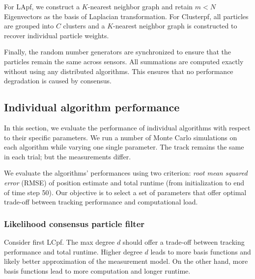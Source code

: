 \documentclass[10pt,letterpaper,final]{article}
\begin{document}
For LApf, we construct a $K$-nearest neighbor graph and retain $m< N$ Eigenvectors as the basis of Laplacian transformation. For Clusterpf, all particles are grouped into $C$ clusters and a $K$-nearest neighbor graph is constructed to recover individual particle weights. 

Finally, the random number generators are synchronized to ensure that the particles remain the same across sensors. All summations are computed exactly without using any distributed algorithms. This ensures that no performance degradation is caused by consensus.

\subsection{Individual algorithm performance}
In this section, we evaluate the performance of individual algorithms with respect to their specific parameters. We run a number of Monte Carlo simulations on each algorithm while varying one single parameter. The track remains the same in each trial; but the measurements differ. 

We evaluate the algorithms' performances using two criterion: \textit{root mean squared error} (RMSE) of position estimate and total runtime (from initialization to end of time step 50). Our objective is to select a set of parameters that offer optimal trade-off between tracking performance and computational load. 

\subsubsection{Likelihood consensus particle filter}
Consider first LCpf. The max degree $d$ should offer a trade-off between tracking performance and total runtime. Higher degree $d$ leads to more basis functions and likely better approximation of the measurement model. On the other hand, more basis functions lead to more computation and longer runtime. 
\end{document}
